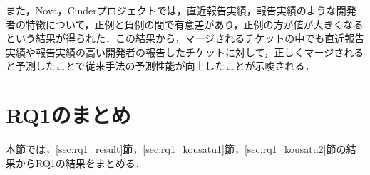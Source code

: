\documentclass[11pt]{jreport}
\begin{document}
また，Nova，Cinderプロジェクトでは，直近報告実績，報告実績のような開発者の特徴について，正例と負例の間で有意差があり，正例の方が値が大きくなるという結果が得られた．この結果から，マージされるチケットの中でも直近報告実績や報告実績の高い開発者の報告したチケットに対して，正しくマージされると予測したことで従来手法の予測性能が向上したことが示唆される．


\begin{table}[t]
\caption{マージ予測モデルにおいて重要度の高い説明変数の正例と負例の有意差および違い}
\label{table:merge_importance_yuisa}
\centering
\vspace{0.5zh}
\end{table}


\section{RQ1のまとめ}\label{sec:rq1_matome}
本節では，\ref{sec:rq1_result}節，\ref{sec:rq1_kousatu1}節，\ref{sec:rq1_kousatu2}節の結果からRQ1の結果をまとめる．
\end{document}
